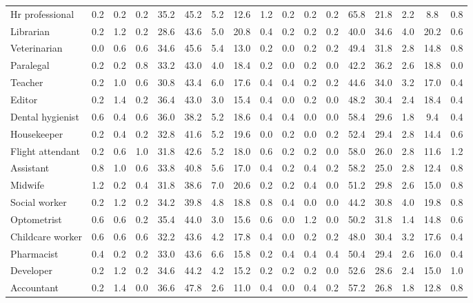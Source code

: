 \begin{table*}[p]
{\begin{tabular}{l|cccccccc|cccccccc}
Hr professional
& 0.2 & 0.2 & 0.2 & 35.2 & 45.2 & 5.2 & 12.6 & 1.2 & 0.2 & 0.2 & 0.2 & 65.8 & 21.8 & 2.2 & 8.8 & 0.8 \\
Librarian
& 0.2 & 1.2 & 0.2 & 28.6 & 43.6 & 5.0 & 20.8 & 0.4 & 0.2 & 0.2 & 0.2 & 40.0 & 34.6 & 4.0 & 20.2 & 0.6 \\
Veterinarian
& 0.0 & 0.6 & 0.6 & 34.6 & 45.6 & 5.4 & 13.0 & 0.2 & 0.0 & 0.2 & 0.2 & 49.4 & 31.8 & 2.8 & 14.8 & 0.8 \\
Paralegal
& 0.2 & 0.2 & 0.8 & 33.2 & 43.0 & 4.0 & 18.4 & 0.2 & 0.0 & 0.2 & 0.0 & 42.2 & 36.2 & 2.6 & 18.8 & 0.0 \\
Teacher
& 0.2 & 1.0 & 0.6 & 30.8 & 43.4 & 6.0 & 17.6 & 0.4 & 0.4 & 0.2 & 0.2 & 44.6 & 34.0 & 3.2 & 17.0 & 0.4 \\
Editor
& 0.2 & 1.4 & 0.2 & 36.4 & 43.0 & 3.0 & 15.4 & 0.4 & 0.0 & 0.2 & 0.0 & 48.2 & 30.4 & 2.4 & 18.4 & 0.4 \\
Dental hygienist
& 0.6 & 0.4 & 0.6 & 36.0 & 38.2 & 5.2 & 18.6 & 0.4 & 0.4 & 0.0 & 0.0 & 58.4 & 29.6 & 1.8 & 9.4 & 0.4 \\
Housekeeper
& 0.2 & 0.4 & 0.2 & 32.8 & 41.6 & 5.2 & 19.6 & 0.0 & 0.2 & 0.0 & 0.2 & 52.4 & 29.4 & 2.8 & 14.4 & 0.6 \\
Flight attendant
& 0.2 & 0.6 & 1.0 & 31.8 & 42.6 & 5.2 & 18.0 & 0.6 & 0.2 & 0.2 & 0.0 & 58.0 & 26.0 & 2.8 & 11.6 & 1.2 \\
Assistant
& 0.8 & 1.0 & 0.6 & 33.8 & 40.8 & 5.6 & 17.0 & 0.4 & 0.2 & 0.4 & 0.2 & 58.2 & 25.0 & 2.8 & 12.4 & 0.8 \\
Midwife
& 1.2 & 0.2 & 0.4 & 31.8 & 38.6 & 7.0 & 20.6 & 0.2 & 0.2 & 0.4 & 0.0 & 51.2 & 29.8 & 2.6 & 15.0 & 0.8 \\
Social worker
& 0.2 & 1.2 & 0.2 & 34.2 & 39.8 & 4.8 & 18.8 & 0.8 & 0.4 & 0.0 & 0.0 & 44.2 & 30.8 & 4.0 & 19.8 & 0.8 \\
Optometrist
& 0.6 & 0.6 & 0.2 & 35.4 & 44.0 & 3.0 & 15.6 & 0.6 & 0.0 & 1.2 & 0.0 & 50.2 & 31.8 & 1.4 & 14.8 & 0.6 \\
Childcare worker
& 0.6 & 0.6 & 0.6 & 32.2 & 43.6 & 4.2 & 17.8 & 0.4 & 0.0 & 0.2 & 0.2 & 48.0 & 30.4 & 3.2 & 17.6 & 0.4 \\
Pharmacist
& 0.4 & 0.2 & 0.2 & 33.0 & 43.6 & 6.6 & 15.8 & 0.2 & 0.4 & 0.4 & 0.4 & 50.4 & 29.4 & 2.6 & 16.0 & 0.4 \\
Developer
& 0.2 & 1.2 & 0.2 & 34.6 & 44.2 & 4.2 & 15.2 & 0.2 & 0.2 & 0.2 & 0.0 & 52.6 & 28.6 & 2.4 & 15.0 & 1.0 \\
Accountant
& 0.2 & 1.4 & 0.0 & 36.6 & 47.8 & 2.6 & 11.0 & 0.4 & 0.0 & 0.4 & 0.2 & 57.2 & 26.8 & 1.8 & 12.8 & 0.8 \\

\end{tabular}}
\end{table*}
